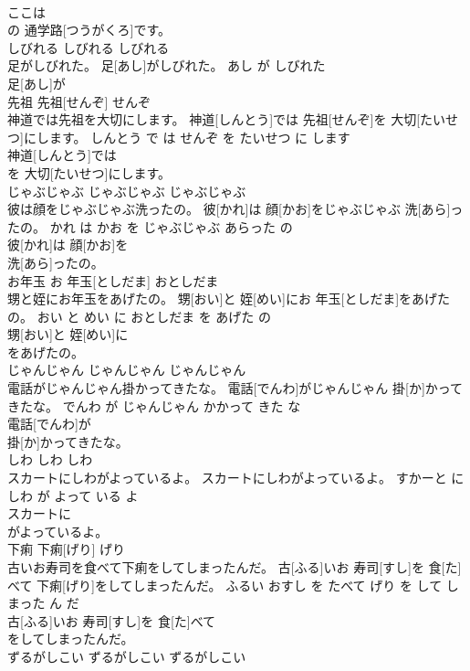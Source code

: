 \documentclass[8pt]{extreport}
\begin{document}
\begin{CJK}{UTF8}{min}
\\	ここは
\\	の 通学路[つうがくろ]です。			
\\	しびれる	しびれる	しびれる	
\\	足がしびれた。	足[あし]がしびれた。	あし が しびれた	
\\	足[あし]が
\\	先祖	先祖[せんぞ]	せんぞ	
\\	神道では先祖を大切にします。	神道[しんとう]では 先祖[せんぞ]を 大切[たいせつ]にします。	しんとう で は せんぞ を たいせつ に します	
\\	神道[しんとう]では
\\	を 大切[たいせつ]にします。			
\\	じゃぶじゃぶ	じゃぶじゃぶ	じゃぶじゃぶ	
\\	彼は顔をじゃぶじゃぶ洗ったの。	彼[かれ]は 顔[かお]をじゃぶじゃぶ 洗[あら]ったの。	かれ は かお を じゃぶじゃぶ あらった の	
\\	彼[かれ]は 顔[かお]を
\\	洗[あら]ったの。			
\\	お年玉	お 年玉[としだま]	おとしだま	
\\	甥と姪にお年玉をあげたの。	甥[おい]と 姪[めい]にお 年玉[としだま]をあげたの。	おい と めい に おとしだま を あげた の	
\\	甥[おい]と 姪[めい]に
\\	をあげたの。			
\\	じゃんじゃん	じゃんじゃん	じゃんじゃん	
\\	電話がじゃんじゃん掛かってきたな。	電話[でんわ]がじゃんじゃん 掛[か]かってきたな。	でんわ が じゃんじゃん かかって きた な	
\\	電話[でんわ]が
\\	掛[か]かってきたな。			
\\	しわ	しわ	しわ	
\\	スカートにしわがよっているよ。	スカートにしわがよっているよ。	すかーと に しわ が よって いる よ	
\\	スカートに
\\	がよっているよ。			
\\	下痢	下痢[げり]	げり	
\\	古いお寿司を食べて下痢をしてしまったんだ。	古[ふる]いお 寿司[すし]を 食[た]べて 下痢[げり]をしてしまったんだ。	ふるい おすし を たべて げり を して しまった ん だ	
\\	古[ふる]いお 寿司[すし]を 食[た]べて
\\	をしてしまったんだ。			
\\	ずるがしこい	ずるがしこい	ずるがしこい	

\end{CJK}
\end{document}
